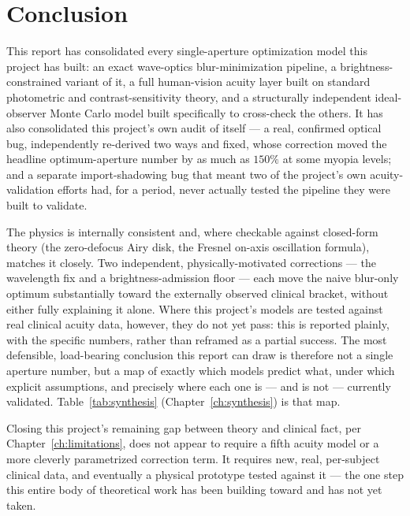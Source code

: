 \chapter{Conclusion}

This report has consolidated every single-aperture optimization model this project has
built: an exact wave-optics blur-minimization pipeline, a brightness-constrained
variant of it, a full human-vision acuity layer built on standard photometric and
contrast-sensitivity theory, and a structurally independent ideal-observer Monte Carlo
model built specifically to cross-check the others. It has also consolidated this
project's own audit of itself --- a real, confirmed optical bug, independently
re-derived two ways and fixed, whose correction moved the headline optimum-aperture
number by as much as $150\%$ at some myopia levels; and a separate import-shadowing
bug that meant two of the project's own acuity-validation efforts had, for a period,
never actually tested the pipeline they were built to validate.

The physics is internally consistent and, where checkable against closed-form theory
(the zero-defocus Airy disk, the Fresnel on-axis oscillation formula), matches it
closely. Two independent, physically-motivated corrections --- the wavelength fix and a
brightness-admission floor --- each move the naive blur-only optimum substantially
toward the externally observed clinical bracket, without either fully explaining it
alone. Where this project's models are tested against real clinical acuity data,
however, they do not yet pass: this is reported plainly, with the specific numbers,
rather than reframed as a partial success. The most defensible, load-bearing
conclusion this report can draw is therefore not a single aperture number, but a map
of exactly which models predict what, under which explicit assumptions, and precisely
where each one is --- and is not --- currently validated. Table~\ref{tab:synthesis}
(Chapter~\ref{ch:synthesis}) is that map.

Closing this project's remaining gap between theory and clinical fact, per
Chapter~\ref{ch:limitations}, does not appear to require a fifth acuity model or a
more cleverly parametrized correction term. It requires new, real, per-subject
clinical data, and eventually a physical prototype tested against it --- the one step
this entire body of theoretical work has been building toward and has not yet taken.

